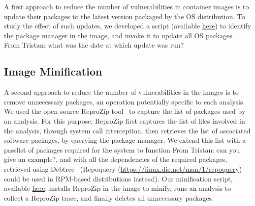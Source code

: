 \documentclass[a4paper,num-refs]{oup-contemporary}
\newcommand{\reprozip}[0]{ReproZip\xspace}
\newcommand{\tristan}[1]{\color{blue}From Tristan: #1\color{black}}
\begin{document}
A first approach to reduce the number of vulnerabilities in container
images is to update their packages to the latest version packaged by the OS
distribution. To study the effect of such updates, we developed a script
(available
\href{https://github.com/big-data-lab-team/container-vulnerabilities-paper/blob/master/Scripts/update}{here})
to identify the package manager in the image, and invoke it to update all
OS packages. \tristan{what was the date at which update was run?}

\subsection{Image Minification}



A second approach to reduce the number of vulnerabilities in the images is
to remove unnecessary packages, an operation potentially specific to each
analysis. We used the open-source \reprozip tool~\cite{rampin2016reprozip}
to capture the list of packages used by an analysis. For this purpose,
\reprozip first captures the list of files involved in the analysis,
through system call interception, then retrieves the list of associated
software packages, by querying the package manager. We extend this list
with a passlist of packages required for the system to function
\tristan{can you give an example?}, and with all the dependencies of the
required packages, retrieved using Debtree~\cite{debtree} (Repoquery
(\url{https://linux.die.net/man/1/repoquery}) could be used in RPM-based
distributions instead). Our minification script, available
\href{https://github.com/big-data-lab-team/container-vulnerabilities-paper/tree/master/Scripts/minification}{here},
installs \reprozip in the image to minify, runs an analysis to collect a
\reprozip trace, and finally deletes all unnecessary packages. 
\end{document}

